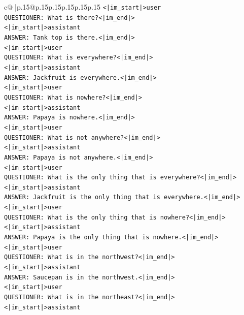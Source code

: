 \documentclass{article}
\begin{document}
{\begin{supertabular}{c@{$\;$}|p{.15\linewidth}@{}p{.15\linewidth}p{.15\linewidth}p{.15\linewidth}p{.15\linewidth}p{.15\linewidth}}
{{{\texttt{<|im\_start|>user} \\
\texttt{QUESTIONER: What is there?<|im\_end|>} \\
\texttt{<|im\_start|>assistant} \\
\texttt{ANSWER: Tank top is there.<|im\_end|>} \\
\texttt{<|im\_start|>user} \\
\texttt{QUESTIONER: What is everywhere?<|im\_end|>} \\
\texttt{<|im\_start|>assistant} \\
\texttt{ANSWER: Jackfruit is everywhere.<|im\_end|>} \\
\texttt{<|im\_start|>user} \\
\texttt{QUESTIONER: What is nowhere?<|im\_end|>} \\
\texttt{<|im\_start|>assistant} \\
\texttt{ANSWER: Papaya is nowhere.<|im\_end|>} \\
\texttt{<|im\_start|>user} \\
\texttt{QUESTIONER: What is not anywhere?<|im\_end|>} \\
\texttt{<|im\_start|>assistant} \\
\texttt{ANSWER: Papaya is not anywhere.<|im\_end|>} \\
\texttt{<|im\_start|>user} \\
\texttt{QUESTIONER: What is the only thing that is everywhere?<|im\_end|>} \\
\texttt{<|im\_start|>assistant} \\
\texttt{ANSWER: Jackfruit is the only thing that is everywhere.<|im\_end|>} \\
\texttt{<|im\_start|>user} \\
\texttt{QUESTIONER: What is the only thing that is nowhere?<|im\_end|>} \\
\texttt{<|im\_start|>assistant} \\
\texttt{ANSWER: Papaya is the only thing that is nowhere.<|im\_end|>} \\
\texttt{<|im\_start|>user} \\
\texttt{QUESTIONER: What is in the northwest?<|im\_end|>} \\
\texttt{<|im\_start|>assistant} \\
\texttt{ANSWER: Saucepan is in the northwest.<|im\_end|>} \\
\texttt{<|im\_start|>user} \\
\texttt{QUESTIONER: What is in the northeast?<|im\_end|>} \\
\texttt{<|im\_start|>assistant} \\
}}}
\end{supertabular}}
\end{document}
